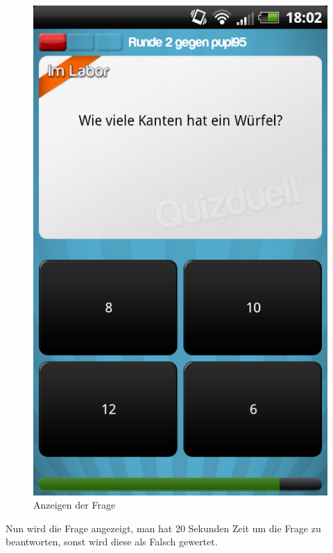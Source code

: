 \documentclass[fontsize=12pt,paper=a4,twoside]{scrartcl}
\begin{document}
\begin{figure}[H]
\centering
\includegraphics[scale=0.5]{Bilder/frage.png}
\caption{Anzeigen der Frage}
\end{figure}

Nun wird die Frage angezeigt, man hat 20 Sekunden Zeit um die Frage zu beantworten, sonst wird diese als Falsch gewertet.\\
\end{document}
